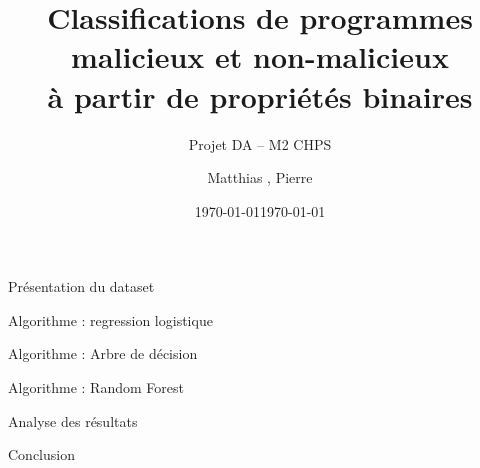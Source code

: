 \documentclass{beamer}
\title[Détection de virus informatique]{Classifications de programmes malicieux et non-malicieux\\ à partir de propriétés binaires}
\author{Matthias \bsc{Beaupère}, Pierre \bsc{Granger}}
\date{\today}
\subtitle{Projet DA -- M2 CHPS}
\date{\today}
\begin{document}

\begin{frame}
  \titlepage
\end{frame}



\begin{frame}{Présentation du dataset}
\end{frame}

\begin{frame}{Algorithme : regression logistique}
\end{frame}

\begin{frame}{Algorithme : Arbre de décision}
\end{frame}

\begin{frame}{Algorithme : Random Forest}
\end{frame}

\begin{frame}{Analyse des résultats}
\end{frame}

\begin{frame}{Conclusion}
\end{frame}
\end{document}
